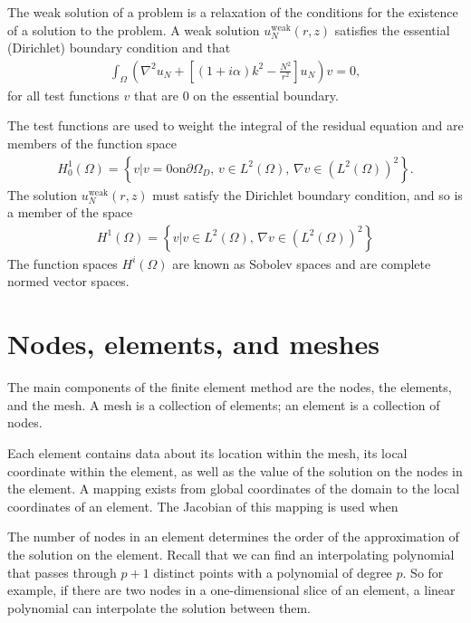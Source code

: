 The weak solution of a problem is a relaxation of the conditions for the existence of a solution to the problem.
A weak solution $u_N^{\mathrm{weak}}(r,z)$ satisfies the essential (Dirichlet) boundary condition and that
\begin{align}
	\int_\Omega \left( \nabla^2 u_N + \left[ (1+i\alpha)k^2-\frac{N^2}{r^2}\right]u_N \right) v = 0,
\end{align}
for all test functions $v$ that are 0 on the essential boundary.

The test functions are used to weight the integral of the residual equation and are members of the function space
\begin{align}
	H^1_0(\Omega) = \left\{ v | v=0 \mathrm{on} \partial\Omega_D, \, v \in L^2(\Omega), \, \nabla v \in (L^2(\Omega))^2 \right\}.
\end{align}
The solution $u_N^{\mathrm{weak}}(r,z)$ must satisfy the Dirichlet boundary condition, and so is a member of the space
\begin{align}
	H^1(\Omega) = \left\{ v | v \in L^2(\Omega), \, \nabla v \in (L^2(\Omega))^2 \right\}
\end{align}
The function spaces $H^i(\Omega)$ are known as Sobolev spaces and are complete normed vector spaces.






\section{Nodes, elements, and meshes}

The main components of the finite element method are the nodes, the elements, and the mesh.
A mesh is a collection of elements; an element is a collection of nodes.

Each element contains data about its location within the mesh, its local coordinate within the element, as well as the value of the solution on the nodes in the element.
A mapping exists from global coordinates of the domain to the local coordinates of an element.
The Jacobian of this mapping is used when 

The number of nodes in an element determines the order of the approximation of the solution on the element.
Recall that we can find an interpolating polynomial that passes through $p+1$ distinct points with a polynomial of degree $p$.
So for example, if there are two nodes in a one-dimensional slice of an element, a linear polynomial can interpolate the solution between them.


